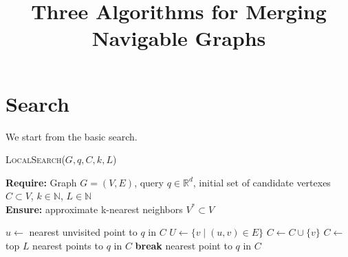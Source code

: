 \documentclass{article}
\title{Three Algorithms for Merging Navigable Graphs}
\author{}
\date{}
\begin{document}
\maketitle

\section {Search}



We start from the basic search. 

\begin{algorithm}
\caption{\textsc{LocalSearch}($G, q, C, k, L$)}\label{alg:local_search}
\textbf{Require:} Graph $G = (V, E)$, query $q \in \mathbb{R}^d$, initial set of candidate vertexes $C \subset V$,  $k \in \mathbb{N}$, $L \in \mathbb{N}$ \\
\textbf{Ensure:} approximate k-nearest neighbors $V^* \subset V$
\begin{algorithmic}[1]
    \State $u \gets$ nearest unvisited point to $q$ in $C$
    \State $U \gets \{v \mid (u, v) \in E\}$
            \State $C \gets C \cup \{v\}$
        \EndIf
    \EndFor
        \State $C \gets$ top $L$ nearest points to $q$ in $C$
    \EndIf
        \State \textbf{break}
    \EndIf
\EndWhile
\State \Return nearest point to $q$ in $C$
\end{algorithmic}
\end{algorithm}
\end{document}
